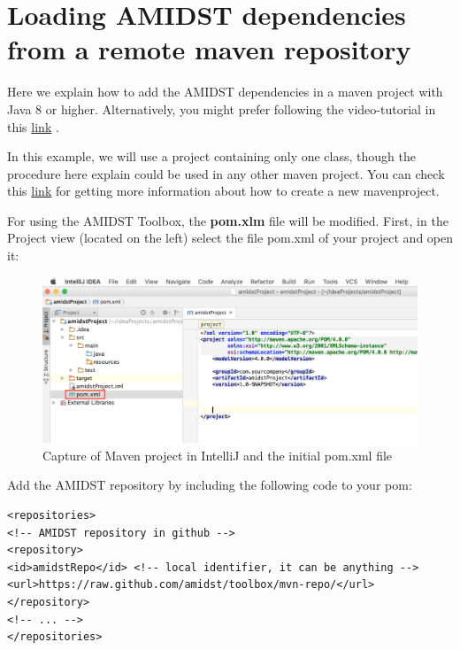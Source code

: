 \documentclass[10pt,a4paper]{article}
\begin{document}
	
	\section{Loading AMIDST dependencies from a remote maven repository}








Here we explain how to add the AMIDST dependencies in a maven project with Java 8 or higher.  Alternatively, you might prefer following the video-tutorial in this \href{https://www.youtube.com/watch?v=i_X6cFo91LE}{link} .\newline

In this example, we will use a  project containing only one class, though the procedure here explain  could be used in any other maven project. You can check this \href{https://www.jetbrains.com/help/idea/2016.1/getting-started-with-maven.html}{link} for getting more information about how to create a new mavenproject.\newline

For using the AMIDST Toolbox, the \textbf{pom.xlm} file will be modified. First, in the Project view (located on the left) select the file pom.xml of your project and open it:\newline


\begin{figure}[h!]
	\includegraphics[width=\linewidth]{img/use_amidst05.png}
	\caption{Capture of Maven project in IntelliJ  and the initial pom.xml file}
	\label{fig:remoteDeps_initialPom}	
\end{figure}



\noindent Add the AMIDST repository by including the following code to your
pom:\newline

\begin{lstlisting}
<repositories>
<!-- AMIDST repository in github -->
<repository>
<id>amidstRepo</id> <!-- local identifier, it can be anything -->
<url>https://raw.github.com/amidst/toolbox/mvn-repo/</url>
</repository>
<!-- ... -->
</repositories>        
\end{lstlisting}
\end{document}

